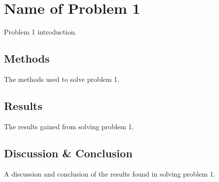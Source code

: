 \chapter{Name of Problem 1}\label{ch:1-problem}
Problem 1 introduction.

\section{Methods}\label{sec:1-problem-method}

The methods used to solve problem 1.

\section{Results}\label{sec:1-problem-results}

The results gained from solving problem 1.

\section{Discussion \& Conclusion}\label{sec:1-problem-discussion-and-conclusion}

A discussion and conclusion of the results found in solving problem 1.

